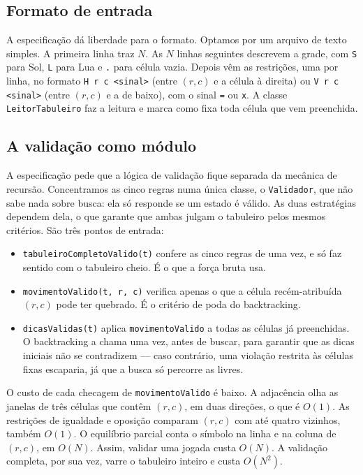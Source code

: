 \documentclass[12pt]{article}
\begin{document}
\subsection{Formato de entrada}

A especificação dá liberdade para o formato. Optamos por um arquivo de texto simples. A primeira linha traz $N$. As $N$ linhas seguintes descrevem a grade, com \texttt{S} para Sol, \texttt{L} para Lua e \texttt{.} para célula vazia. Depois vêm as restrições, uma por linha, no formato \texttt{H r c <sinal>} (entre $(r,c)$ e a célula à direita) ou \texttt{V r c <sinal>} (entre $(r,c)$ e a de baixo), com o sinal \texttt{=} ou \texttt{x}. A classe \texttt{LeitorTabuleiro} faz a leitura e marca como fixa toda célula que vem preenchida.

\subsection{A validação como módulo}
\label{sec:validador}

A especificação pede que a lógica de validação fique separada da mecânica de recursão. Concentramos as cinco regras numa única classe, o \texttt{Validador}, que não sabe nada sobre busca: ela só responde se um estado é válido. As duas estratégias dependem dela, o que garante que ambas julgam o tabuleiro pelos mesmos critérios. São três pontos de entrada:

\begin{itemize}
  \item \texttt{tabuleiroCompletoValido(t)} confere as cinco regras de uma vez, e só faz sentido com o tabuleiro cheio. É o que a força bruta usa.
  \item \texttt{movimentoValido(t, r, c)} verifica apenas o que a célula recém-atribuída $(r,c)$ pode ter quebrado. É o critério de poda do backtracking.
  \item \texttt{dicasValidas(t)} aplica \texttt{movimentoValido} a todas as células já preenchidas. O backtracking a chama uma vez, antes de buscar, para garantir que as dicas iniciais não se contradizem --- caso contrário, uma violação restrita às células fixas escaparia, já que a busca só percorre as livres.
\end{itemize}

O custo de cada checagem de \texttt{movimentoValido} é baixo. A adjacência olha as janelas de três células que contêm $(r,c)$, em duas direções, o que é $O(1)$. As restrições de igualdade e oposição comparam $(r,c)$ com até quatro vizinhos, também $O(1)$. O equilíbrio parcial conta o símbolo na linha e na coluna de $(r,c)$, em $O(N)$. Assim, validar uma jogada custa $O(N)$. A validação completa, por sua vez, varre o tabuleiro inteiro e custa $O(N^2)$.
\end{document}
